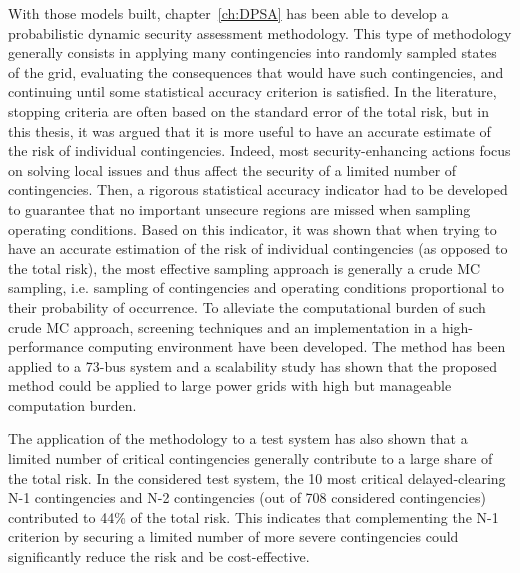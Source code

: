 With those models built, chapter~\ref{ch:DPSA} has been able to develop a probabilistic dynamic security assessment methodology. This type of methodology generally consists in applying many contingencies into randomly sampled states of the grid, evaluating the consequences that would have such contingencies, and continuing until some statistical accuracy criterion is satisfied. In the literature, stopping criteria are often based on the standard error of the total risk, but in this thesis, it was argued that it is more useful to have an accurate estimate of the risk of individual contingencies. Indeed, most security-enhancing actions focus on solving local issues and thus affect the security of a limited number of contingencies. Then, a rigorous statistical accuracy indicator had to be developed to guarantee that no important unsecure regions are missed when sampling operating conditions. Based on this indicator, it was shown that when trying to have an accurate estimation of the risk of individual contingencies (as opposed to the total risk), the most effective sampling approach is generally a crude MC sampling, i.e. sampling of contingencies and operating conditions proportional to their probability of occurrence. To alleviate the computational burden of such crude MC approach, screening techniques and an implementation in a high-performance computing environment have been developed. The method has been applied to a 73-bus system and a scalability study has shown that the proposed method could be applied to large power grids with high but manageable computation burden.

The application of the methodology to a test system has also shown that a limited number of critical contingencies generally contribute to a large share of the total risk. In the considered test system, the 10 most critical delayed-clearing N-1 contingencies and N-2 contingencies (out of 708 considered contingencies) contributed to 44\% of the total risk. This indicates that complementing the N-1 criterion by securing a limited number of more severe contingencies could significantly reduce the risk and be cost-effective.

